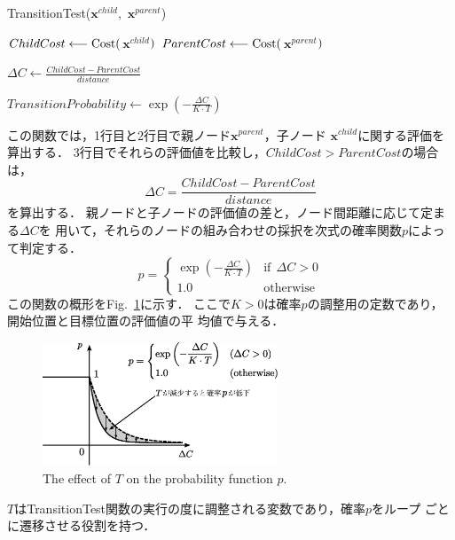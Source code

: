 \documentclass[a4paper,12pt]{jarticle}
\begin{document}

%
\begin{algorithm}[t]
\caption{TransitionTest($\bm{x}^{child}$,\ $\bm{x}^{parent}$)\label{transitionTest}}
 \nl$ChildCost \longleftarrow \rm{Cost(}$$\bm{x}^{child}$$\rm{)}$\;
 \nl$ParentCost \longleftarrow \rm{Cost(}$$\bm{x}^{parent}$$\rm{)}$\;

 \nl{}

 \nl$\Delta C \longleftarrow \displaystyle\frac{ChildCost - ParentCost}{distance}$\;

 \nl$TransitionProbability \longleftarrow \exp\left(-\displaystyle\frac{\Delta C}{K\cdot T}\right)$\;


 \nl{} \nl{}
\end{algorithm}
%
この関数では，1行目と2行目で親ノード$\bm{x}^{parent}$，子ノード
$\bm{x}^{child}$に関する評価を算出する．
%
3行目でそれらの評価値を比較し，$ChildCost > ParentCost$の場合は，
\begin{equation}
\label{eq:cb}
  \Delta C = \frac{ChildCost - ParentCost}{distance}
\end{equation}
を算出する．
%
親ノードと子ノードの評価値の差と，ノード間距離に応じて定まる$\Delta C$を
用いて，それらのノードの組み合わせの採択を次式の確率関数$p$によって判定する．
\begin{equation}
\label{eq:ca}
  p = \begin{cases}
    \exp\left(-\displaystyle\frac{\Delta C}{K\cdot T}\right) &
       \mathrm{if}\ \  \Delta C >0 \\
    1.0 & \mathrm{otherwise}
  \end{cases}
\end{equation}
この関数の概形をFig.~\ref{fig:確率関数$p$}に示す．
ここで$K>0$は確率$p$の調整用の定数であり，開始位置と目標位置の評価値の平
均値で与える．
%
\begin{figure}[b]
  \centering
  \includegraphics[clip,width=7cm]{../figure/eps/T-RRT_P.eps}
  \caption{The effect of $T$ on the probability function $p$.}
  \label{fig:確率関数$p$}
\end{figure}
%
$T$はTransitionTest関数の実行の度に調整される変数であり，確率$p$をループ
ごとに遷移させる役割を持つ．
\end{document}
